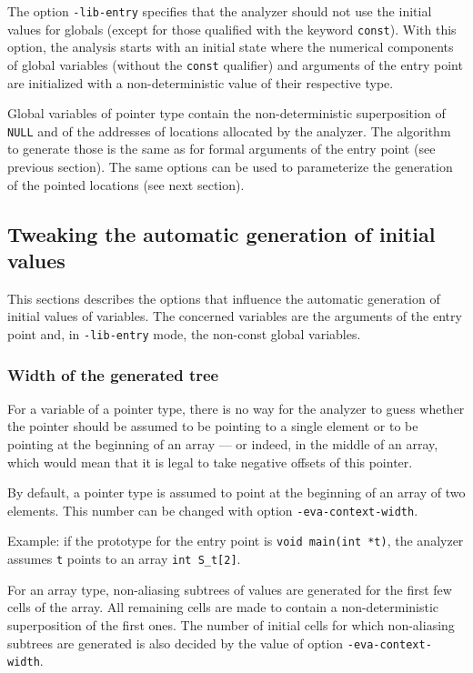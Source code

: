 \documentclass{frama-c-book}
\begin{document}

The option \lstinline|-lib-entry| specifies that the analyzer should not use
the initial values for globals (except for those qualified
with the keyword \lstinline|const|).
With this option, the analysis starts with an initial state
where the numerical components of
global variables (without the \lstinline|const| qualifier) and arguments
of the entry point are initialized with a non-deterministic value of their
respective type.

Global variables of pointer type contain the non-deterministic
superposition of \lstinline|NULL| and of the addresses of
locations allocated by the analyzer. The algorithm to generate
those is the same as for formal arguments of the entry point (see previous
section). The same options can be used to parameterize the generation of
the pointed locations (see next section).

\subsection{Tweaking the automatic generation of initial values}
\label{generation_initial}

This sections describes the options that influence
the automatic generation of initial values
of variables. The concerned
variables are the arguments of the entry point and,
in \lstinline|-lib-entry| mode, the non-const global variables.

\subsubsection{Width of the generated tree}

For a variable of a pointer type, there is no way for the analyzer
to guess whether the pointer should be assumed to be pointing to a single
element or to be pointing at the
beginning of an array --- or indeed, in the middle of an array, which
would mean that it is legal to take negative offsets of this pointer.

By default, a pointer type is assumed to point at the beginning
of an array of two elements. This number can be changed with option
\lstinline|-eva-context-width|.

Example: if the prototype for the entry point is \lstinline|void main(int *t)|,
the analyzer assumes \lstinline|t| points to an array \lstinline|int S_t[2]|.

For an array type, non-aliasing subtrees of values
are generated for the first
few cells of the array. All remaining cells are made to contain a
non-deterministic superposition of the first ones. The number
of initial cells for which non-aliasing subtrees are generated is
also decided by the value of option \lstinline|-eva-context-width|.
\end{document}
